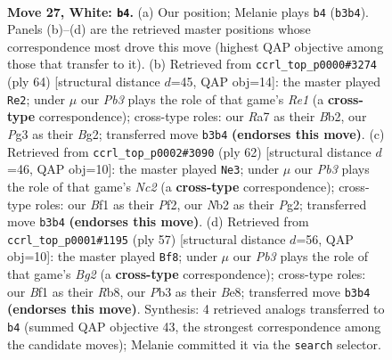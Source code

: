 \documentclass[11pt]{article}
\begin{document}
\clearpage

\begin{figure}[p]\centering
\begin{subfigure}{0.46\textwidth}\centering
\resizebox{\linewidth}{!}{%
\newchessgame
\chessboard[
  setfen={4b1k1/R4pp1/4pn2/1p5p/3P1P2/1Pr3PP/1N2P3/5BK1 w - - 1 27},
  showmover=false,
  pgfstyle=straightmove, color=movearrow, markmove={b3-b4}
]}
\caption{}
\end{subfigure}\hfill
\begin{subfigure}{0.46\textwidth}\centering
\resizebox{\linewidth}{!}{%
\newchessgame
\chessboard[
  setfen={2r3k1/p3np1p/1p4p1/8/1P1p1PPb/P2P4/1B4BP/4R1K1 w - - 1 33},
  showmover=false,
  pgfstyle=straightmove, color=movearrow, markmove={e1-e2}
]}
\caption{}
\end{subfigure}
\\[4pt]
\begin{subfigure}{0.46\textwidth}\centering
\resizebox{\linewidth}{!}{%
\newchessgame
\chessboard[
  setfen={5k2/p2Rb1p1/2n1P2p/2p2B1P/8/P1p5/1rN2PP1/6K1 w - - 0 32},
  showmover=false,
  pgfstyle=straightmove, color=movearrow, markmove={c2-e3}
]}
\caption{}
\end{subfigure}\hfill
\begin{subfigure}{0.46\textwidth}\centering
\resizebox{\linewidth}{!}{%
\newchessgame
\chessboard[
  setfen={1r2b1k1/4R1bp/1P4p1/np6/1N2pP2/1P2B1P1/P3P2P/5K2 b - - 0 29},
  showmover=false,
  pgfstyle=straightmove, color=movearrow, markmove={g7-f8}
]}
\caption{}
\end{subfigure}
\caption{\textbf{Move 27, White: \texttt{b4}.} (a) Our position; Melanie plays \texttt{b4} (\texttt{b3b4}). Panels (b)--(d) are the retrieved master positions whose correspondence most drove this move (highest QAP objective among those that transfer to it). (b) Retrieved from \texttt{ccrl\_top\_p0000\#3274} (ply 64) [structural distance $d$=45, QAP obj=14]: the master played \texttt{Re2}; under $\mu$ our \emph{Pb3} plays the role of that game's \emph{Re1} (a \textbf{cross-type} correspondence); cross-type roles: our \emph{R}a7 as their \emph{B}b2, our \emph{P}g3 as their \emph{B}g2; transferred move \texttt{b3b4} \textbf{(endorses this move)}. (c) Retrieved from \texttt{ccrl\_top\_p0002\#3090} (ply 62) [structural distance $d$=46, QAP obj=10]: the master played \texttt{Ne3}; under $\mu$ our \emph{Pb3} plays the role of that game's \emph{Nc2} (a \textbf{cross-type} correspondence); cross-type roles: our \emph{B}f1 as their \emph{P}f2, our \emph{N}b2 as their \emph{P}g2; transferred move \texttt{b3b4} \textbf{(endorses this move)}. (d) Retrieved from \texttt{ccrl\_top\_p0001\#1195} (ply 57) [structural distance $d$=56, QAP obj=10]: the master played \texttt{Bf8}; under $\mu$ our \emph{Pb3} plays the role of that game's \emph{Bg2} (a \textbf{cross-type} correspondence); cross-type roles: our \emph{B}f1 as their \emph{R}b8, our \emph{P}b3 as their \emph{B}e8; transferred move \texttt{b3b4} \textbf{(endorses this move)}. Synthesis: 4 retrieved analogs transferred to \texttt{b4} (summed QAP objective 43, the strongest correspondence among the candidate moves); Melanie committed it via the \texttt{search} selector.}
\label{fig:thought-m52}
\end{figure}
\end{document}
